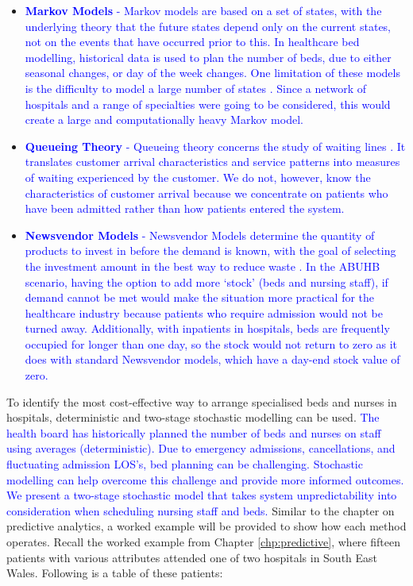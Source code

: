 \documentclass[../thesis.tex]{subfiles}
\begin{document}
\begin{itemize}
    \item \textcolor{blue}{\textbf{Markov Models} - Markov models are based on a set of states, with the underlying theory that the future states depend only on the current states, not on the events that have occurred prior to this. In healthcare bed modelling, historical data is used to plan the number of beds, due to either seasonal changes, or day of the week changes. One limitation of these models is the difficulty to model a large number of states \cite{Carta2020}. Since a network of hospitals and a range of specialties were going to be considered, this would create a large and computationally heavy Markov model.}
    \item \textcolor{blue}{\textbf{Queueing Theory} - Queueing theory concerns the study of waiting lines \cite{Shortle2017}. It translates customer arrival characteristics and service patterns into measures of waiting experienced by the customer. We do not, however, know the characteristics of customer arrival because we concentrate on patients who have been admitted rather than how patients entered the system.}
    \item \textcolor{blue}{\textbf{Newsvendor Models} - Newsvendor Models determine the quantity of products to invest in before the demand is known, with the goal of selecting the investment amount in the best way to reduce waste \cite{Silver2016}. In the ABUHB scenario, having the option to add more `stock' (beds and nursing staff), if demand cannot be met would make the situation more practical for the healthcare industry because patients who require admission would not be turned away. Additionally, with inpatients in hospitals, beds are frequently occupied for longer than one day, so the stock would not return to zero as it does with standard Newsvendor models, which have a day-end stock value of zero.}
\end{itemize}

To identify the most cost-effective way to arrange specialised beds and nurses in hospitals, deterministic and two-stage stochastic modelling can be used. \textcolor{blue}{The health board has historically planned the number of beds and nurses on staff using averages (deterministic). Due to emergency admissions, cancellations, and fluctuating admission LOS's, bed planning can be challenging. Stochastic modelling can help overcome this challenge and provide more informed outcomes. We present a two-stage stochastic model that takes system unpredictability into consideration when scheduling nursing staff and beds.} Similar to the chapter on predictive analytics, a worked example will be provided to show how each method operates. Recall the worked example from Chapter \ref{chp:predictive}, where fifteen patients with various attributes attended one of two hospitals in South East Wales. Following is a table of these patients:
\end{document}
